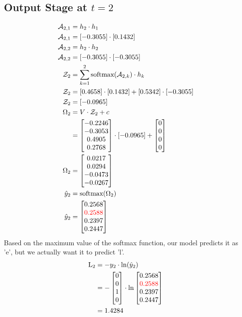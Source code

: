 \documentclass{article}
\begin{document}
\subsection*{Output Stage at $t=2$}
\begin{align*}
\mathcal{A}_{2,1} &= h_2 \cdot h_1 \\
\mathcal{A}_{2,1} &= [-0.3055] \cdot [0.1432] \\
\mathcal{A}_{2,2} &= h_2 \cdot h_2 \\
\mathcal{A}_{2,2} &= [-0.3055] \cdot [-0.3055] \\
\mathcal{Z}_2 &= \sum_{k=1}^2 \text{softmax}(\mathcal{A}_{2,k}) \cdot h_k \\
\mathcal{Z}_2 &= [0.4658] \cdot [0.1432] + [0.5342] \cdot [-0.3055]\\
\mathcal{Z}_2 &= [-0.0965] \\
\Omega_2 &= V \cdot \mathcal{Z}_2 + c \\
 &= \begin{bmatrix} -0.2246 \\ -0.3053 \\ 0.4905 \\ 0.2768 \end{bmatrix} \cdot [-0.0965] + \begin{bmatrix} 0 \\ 0 \\ 0 \\ 0\end{bmatrix}\\
\Omega_2 &= \begin{bmatrix} 0.0217 \\ 0.0294 \\ -0.0473 \\ -0.0267 \end{bmatrix} \\
\hat{y}_2 &= \text{softmax}(\Omega_2) \\
\hat{y}_2 &= \begin{bmatrix} 0.2568 \\ \textcolor{red}{0.2588} \\ 0.2397 \\ 0.2447 \end{bmatrix} \\
\end{align*}
Based on the maximum value of the softmax function, our model predicts it as 'e', but we actually want it to predict 'l'.
\begin{align*}
    \text{L}_{2} & = -y_2 \cdot \ln(\hat{y}_2) \\
    &=-\begin{bmatrix} 0 \\ 0 \\ 1 \\ 0 \end{bmatrix} \cdot \ln{\begin{bmatrix} 0.2568 \\ \textcolor{red}{0.2588} \\ 0.2397 \\ 0.2447 \end{bmatrix}}\\
    &=1.4284
\end{align*}
\end{document}

